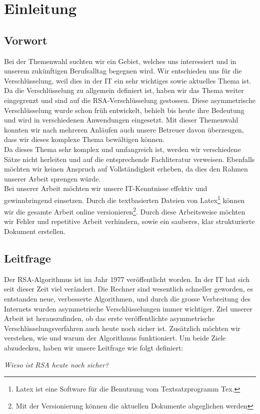 \section{Einleitung}
\subsection{Vorwort}
Bei der Themenwahl suchten wir ein Gebiet, welches uns interessiert und in unserem zukünftigen Berufsalltag begegnen wird. Wir entschieden uns für die Verschlüsselung, weil dies in der IT ein sehr wichtiges sowie aktuelles Thema ist. Da die Verschlüsselung zu allgemein definiert ist, haben wir das Thema weiter eingegrenzt und sind auf die RSA-Verschlüsselung gestossen. Diese asymmetrische Verschlüsselung wurde schon früh entwickelt, behielt bis heute ihre Bedeutung und wird in verschiedenen Anwendungen eingesetzt. Mit dieser Themenwahl konnten wir nach mehreren Anläufen auch unsere Betreuer davon überzeugen, dass wir dieses komplexe Thema bewältigen können. \\
Da dieses Thema sehr komplex und umfangreich ist, werden wir verschiedene Sätze nicht herleiten und auf die entsprechende Fachliteratur verweisen. Ebenfalls möchten wir keinen Anspruch auf Vollständigkeit erheben, da dies den Rahmen unserer Arbeit sprengen würde. \\
Bei unserer Arbeit möchten wir unsere IT-Kenntnisse effektiv und gewinnbringend einsetzen. Durch die textbasierten Dateien von Latex\footnote{Latex ist eine Software für die Benutzung vom Textsatzprogramm Tex.} können wir die gesamte Arbeit online versionieren\footnote{Mit der Versionierung können die aktuellen Dokumente abgeglichen werden}. Durch diese Arbeitsweise möchten wir Fehler und repetitive Arbeit verhindern, sowie ein sauberes, klar strukturierte Dokument erstellen. 
%
\subsection{Leitfrage}
Der RSA-Algorithmus ist im Jahr 1977 veröffentlicht worden. In der IT hat sich seit dieser Zeit viel verändert. Die Rechner sind wesentlich schneller geworden, es entstanden neue, verbesserte Algorithmen, und durch die grosse Verbreitung des Internets wurden asymmetrische Verschlüsselungen immer wichtiger. Ziel unserer Arbeit ist herauszufinden, ob das erste veröffentlichte asymmetrische Verschlüsselungsverfahren auch heute noch sicher ist. Zusätzlich möchten wir verstehen, wie und warum der Algorithmus funktioniert. Um beide Ziele abzudecken, haben wir unsere Leitfrage wie folgt definiert:\\
\begin{center}\textit{Wieso ist RSA heute noch sicher?}\end{center}
